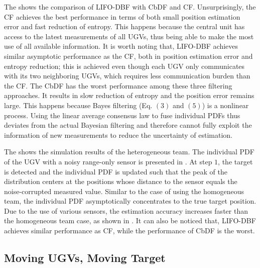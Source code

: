 \documentclass[journal]{IEEEtranTIE}
\theoremstyle{remark}
\begin{document}
The  shows the comparison of LIFO-DBF with CbDF and CF.
Unsurprisingly, the CF achieves the best performance in terms of both small position estimation error and fast reduction of entropy. 
This happens because the central unit has access to the latest measurements of all UGVs, thus being able to make the most use of all available information.
It is worth noting that, LIFO-DBF achieves similar asymptotic performance as the CF, both in position estimation error and entropy reduction; this is achieved even though each UGV only communicates with its two neighboring UGVs, which requires less communication burden than the CF.
The CbDF has the worst performance among these three filtering approaches. 
It results in slow reduction of entropy and the position error remains large.
This happens because Bayes filtering (Eq. $(3)$ and $(5)$) is a nonlinear process.
Using the linear average consensus law to fuse individual PDFs thus deviates from the actual Bayesian filtering and therefore cannot fully exploit the information of new measurements to reduce the uncertainty of estimation.

The  shows the simulation results of the heterogeneous team.
The individual PDF of the UGV with a noisy range-only sensor is presented in .
At step $1$, the target is detected and the individual PDF is updated such that the peak of the  distribution centers at the positions whose distance to the sensor equals the noise-corrupted measured value. 
Similar to the case of using the homogeneous team, the individual PDF asymptotically concentrates to the true target position.
Due to the use of various sensors, the estimation accuracy increases faster than the homogeneous team case, as shown in .
It can also be noticed that, LIFO-DBF achieves similar performance as CF, while the performance of CbDF is the worst.

%
\subsection{Moving UGVs, Moving Target}
\end{document}
